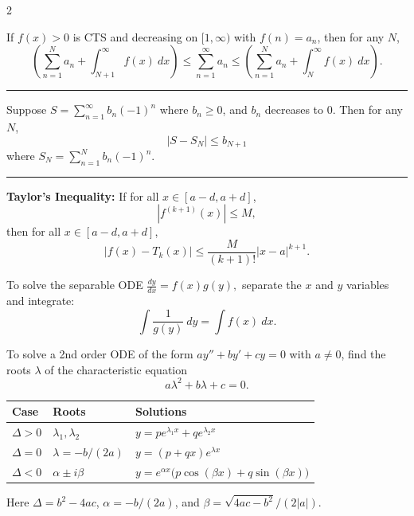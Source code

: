 \documentclass{article}
\newenvironment{bx}[1][]{
\begin{tcolorbox}[colback=white!97!black, title=#1, arc=0in, halign=flush left, left=1mm, right=1mm,]
}{
\end{tcolorbox}
}
\begin{document}
\begin{multicols}{2}
\begin{bx}[Test for Convergence and Divergence]
\begin{itemize}[leftmargin=1em]
\end{itemize}
\end{bx}





\newpage



\begin{bx}[Bounding Error]

If $f(x)>0$ is CTS and decreasing on $[1,\infty)$ with $f(n)=a_n$, then for any $N$,
$$\left(\sum_{n=1}^N a_n+\int_{N+1}^\infty f(x)\ dx \right)
\leq \sum_{n=1}^\infty a_n \leq 
\left(\sum_{n=1}^N a_n+  \int_{N}^\infty f(x)\ dx\right).$$

\hrule
\vspace{1em}

Suppose $S=\sum_{n=1}^\infty b_n (-1)^n$ where $b_n\geq 0$, and $b_n$ decreases to 0. Then for any $N$,
$$\left|S-S_N\right|\leq b_{N+1}$$
where $S_N=\sum_{n=1}^N b_n (-1)^n$.
\vspace{1em}

\hrule
\vspace{1em}

\textbf{Taylor's Inequality:}
If for all $x\in [a-d,a+d]$,
$$\left|f^{(k+1)}(x)\right|\leq M,$$
then for all $x\in [a-d,a+d]$,
$$|f(x)-T_k(x)|\leq \frac{M}{(k+1)!}|x-a|^{k+1}.$$


\end{bx}



\columnbreak


\begin{bx}[Solving ODEs]

To solve the separable ODE  $\displaystyle \frac{dy}{dx}=f(x)g(y),$
separate the $x$ and $y$ variables and integrate:
$$\int \frac{1}{g(y)}\ dy = \int f(x)\ dx.$$

To solve a 2nd order ODE of the form $ay''+by'+cy=0$ with $a\ne0$,
find the roots $\lambda$ of the characteristic equation
$$a\lambda^2 + b\lambda + c = 0.$$
\begin{center}
\small
\begin{tabular}{@{}lll@{}}
\toprule[0.4mm]
Case & Roots & Solutions\\
\midrule
$\Delta>0$ & $\lambda_1,\lambda_2$ & $y=pe^{\lambda_1 x}+qe^{\lambda_2 x}$\\
$\Delta=0$ & $\lambda=-b/(2a)$ & $y=(p+qx)e^{\lambda x}$\\
$\Delta<0$ & $\alpha\pm i\beta$ & $y=e^{\alpha x}\bigl(p\cos(\beta x)+q\sin(\beta x)\bigr)$\\
\bottomrule[0.4mm]
\end{tabular}
\end{center}
Here $\Delta=b^2-4ac$, $\alpha=-b/(2a)$, and $\beta=\sqrt{4ac-b^2}/(2|a|)$.


\end{bx}
\end{multicols}
\end{document}
